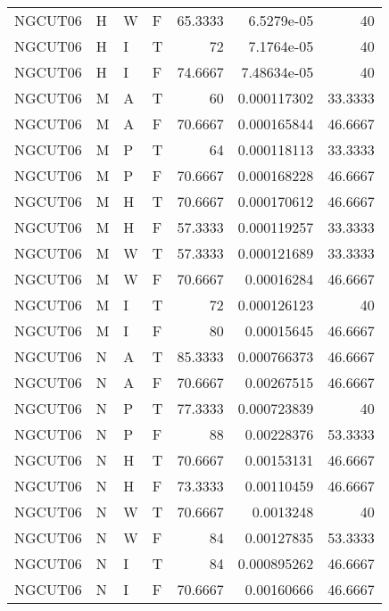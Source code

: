 \begin{table}[!htb]
{\begin{tabular}{llllrrr}
            NGCUT06  & H     & W     & F          & 65.3333    & 6.5279e-05  & 40       \\
            NGCUT06  & H     & I     & T          & 72         & 7.1764e-05  & 40       \\
            NGCUT06  & H     & I     & F          & 74.6667    & 7.48634e-05 & 40       \\
            NGCUT06  & M     & A     & T          & 60         & 0.000117302 & 33.3333  \\
            NGCUT06  & M     & A     & F          & 70.6667    & 0.000165844 & 46.6667  \\
            NGCUT06  & M     & P     & T          & 64         & 0.000118113 & 33.3333  \\
            NGCUT06  & M     & P     & F          & 70.6667    & 0.000168228 & 46.6667  \\
            NGCUT06  & M     & H     & T          & 70.6667    & 0.000170612 & 46.6667  \\
            NGCUT06  & M     & H     & F          & 57.3333    & 0.000119257 & 33.3333  \\
            NGCUT06  & M     & W     & T          & 57.3333    & 0.000121689 & 33.3333  \\
            NGCUT06  & M     & W     & F          & 70.6667    & 0.00016284  & 46.6667  \\
            NGCUT06  & M     & I     & T          & 72         & 0.000126123 & 40       \\
            NGCUT06  & M     & I     & F          & 80         & 0.00015645  & 46.6667  \\
            NGCUT06  & N     & A     & T          & 85.3333    & 0.000766373 & 46.6667  \\
            NGCUT06  & N     & A     & F          & 70.6667    & 0.00267515  & 46.6667  \\
            NGCUT06  & N     & P     & T          & 77.3333    & 0.000723839 & 40       \\
            NGCUT06  & N     & P     & F          & 88         & 0.00228376  & 53.3333  \\
            NGCUT06  & N     & H     & T          & 70.6667    & 0.00153131  & 46.6667  \\
            NGCUT06  & N     & H     & F          & 73.3333    & 0.00110459  & 46.6667  \\
            NGCUT06  & N     & W     & T          & 70.6667    & 0.0013248   & 40       \\
            NGCUT06  & N     & W     & F          & 84         & 0.00127835  & 53.3333  \\
            NGCUT06  & N     & I     & T          & 84         & 0.000895262 & 46.6667  \\
            NGCUT06  & N     & I     & F          & 70.6667    & 0.00160666  & 46.6667  \\
            \hline
        \end{tabular}
    }{}
\end{table}